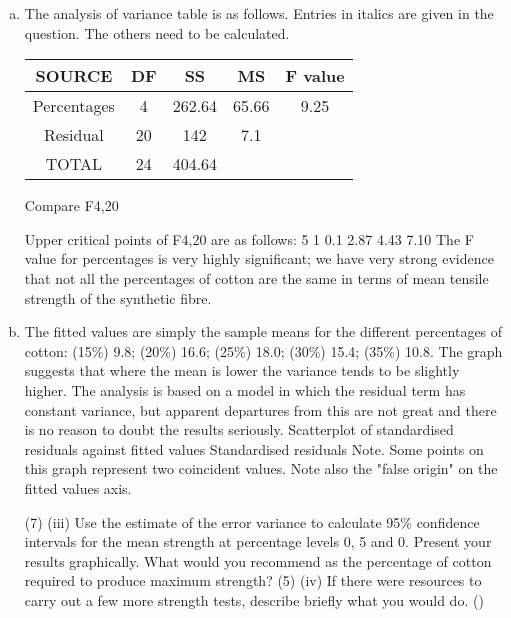 \documentclass[a4paper,12pt]{article}
\begin{document}
\begin{enumerate}[(a)]
\item The analysis of variance table is as follows. Entries in italics are given in the question. The others need to be calculated.

\begin{center}
\begin{tabular}{c|c|c|c|c|}
SOURCE	&	DF	&	SS	&	MS	&	F value	\\ \hline 
Percentages	&	4	&	262.64	&	65.66	&	9.25	\\ \hline 
Residual	&	20	&	142	&	7.1	&		\\ \hline 
TOTAL	&	24	&	404.64	&		&		\\ \hline 
\end{tabular}
\end{center}

 Compare F4,20

Upper critical points of F4,20 are as follows:
5%
1%
0.1%
2.87
4.43
7.10
The F value for percentages is very highly significant; we have very strong evidence that not all the percentages of cotton are the same in terms of mean tensile strength of the synthetic fibre.
\item The fitted values are simply the sample means for the different percentages of cotton: (15\%) 9.8; (20\%) 16.6; (25\%) 18.0; (30\%) 15.4; (35\%) 10.8. The graph suggests that where the mean is lower the variance tends to be slightly higher. The analysis is based on a model in which the residual term has constant variance, but apparent departures from this are not great and there is no reason to doubt the results seriously.
Scatterplot of standardised residuals against fitted values
Standardised residuals
Note. Some points on this graph represent two coincident values.
Note also the "false origin" on the fitted values axis.

\newpage

\begin{framed}
(7)
(iii) Use the estimate of the error variance to calculate 95\% confidence intervals for
the mean strength at percentage levels 0, 5 and 0. Present your results
graphically. What would you recommend as the percentage of cotton required
to produce maximum strength?
(5)
(iv) If there were resources to carry out a few more strength tests, describe briefly
what you would do.
()
\end{framed}


\end{enumerate}
\end{document}
